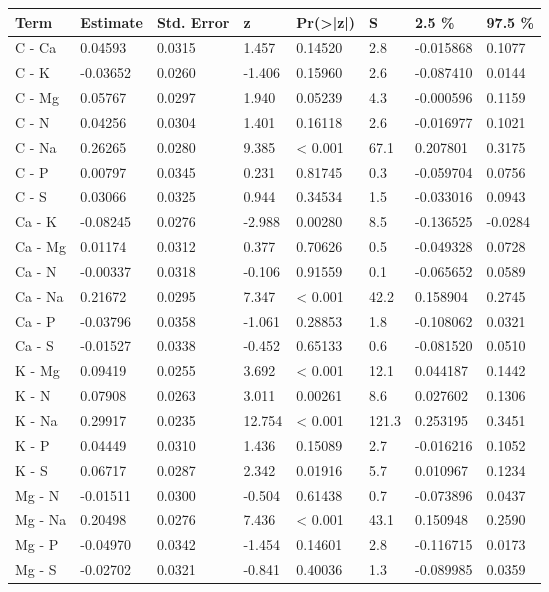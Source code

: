 
\begin{tabular}[t]{llllllll}
\toprule
Term & Estimate & Std. Error & z & Pr(>|z|) & S & 2.5 \% & 97.5 \%\\
\midrule
C - Ca & 0.04593 & 0.0315 & 1.457 & 0.14520 & 2.8 & -0.015868 & 0.1077\\
C - K & -0.03652 & 0.0260 & -1.406 & 0.15960 & 2.6 & -0.087410 & 0.0144\\
C - Mg & 0.05767 & 0.0297 & 1.940 & 0.05239 & 4.3 & -0.000596 & 0.1159\\
C - N & 0.04256 & 0.0304 & 1.401 & 0.16118 & 2.6 & -0.016977 & 0.1021\\
C - Na & 0.26265 & 0.0280 & 9.385 & < 0.001 & 67.1 & 0.207801 & 0.3175\\
C - P & 0.00797 & 0.0345 & 0.231 & 0.81745 & 0.3 & -0.059704 & 0.0756\\
C - S & 0.03066 & 0.0325 & 0.944 & 0.34534 & 1.5 & -0.033016 & 0.0943\\
Ca - K & -0.08245 & 0.0276 & -2.988 & 0.00280 & 8.5 & -0.136525 & -0.0284\\
Ca - Mg & 0.01174 & 0.0312 & 0.377 & 0.70626 & 0.5 & -0.049328 & 0.0728\\
Ca - N & -0.00337 & 0.0318 & -0.106 & 0.91559 & 0.1 & -0.065652 & 0.0589\\
Ca - Na & 0.21672 & 0.0295 & 7.347 & < 0.001 & 42.2 & 0.158904 & 0.2745\\
Ca - P & -0.03796 & 0.0358 & -1.061 & 0.28853 & 1.8 & -0.108062 & 0.0321\\
Ca - S & -0.01527 & 0.0338 & -0.452 & 0.65133 & 0.6 & -0.081520 & 0.0510\\
K - Mg & 0.09419 & 0.0255 & 3.692 & < 0.001 & 12.1 & 0.044187 & 0.1442\\
K - N & 0.07908 & 0.0263 & 3.011 & 0.00261 & 8.6 & 0.027602 & 0.1306\\
K - Na & 0.29917 & 0.0235 & 12.754 & < 0.001 & 121.3 & 0.253195 & 0.3451\\
K - P & 0.04449 & 0.0310 & 1.436 & 0.15089 & 2.7 & -0.016216 & 0.1052\\
K - S & 0.06717 & 0.0287 & 2.342 & 0.01916 & 5.7 & 0.010967 & 0.1234\\
Mg - N & -0.01511 & 0.0300 & -0.504 & 0.61438 & 0.7 & -0.073896 & 0.0437\\
Mg - Na & 0.20498 & 0.0276 & 7.436 & < 0.001 & 43.1 & 0.150948 & 0.2590\\
Mg - P & -0.04970 & 0.0342 & -1.454 & 0.14601 & 2.8 & -0.116715 & 0.0173\\
Mg - S & -0.02702 & 0.0321 & -0.841 & 0.40036 & 1.3 & -0.089985 & 0.0359\\

\end{tabular}
